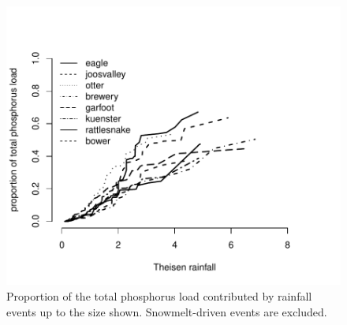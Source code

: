 \documentclass[10pt]{article}
\begin{document}
\begin{figure}
    \begin{center}
\includegraphics{loadings-figure3}
    \end{center}
    \caption{Proportion of the total phosphorus load contributed by rainfall events up to the size shown. Snowmelt-driven events are excluded.\label{cdf-s}}
\end{figure}
\end{document}
